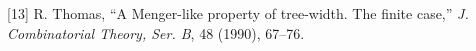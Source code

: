 [13] R. Thomas, ``A Menger-like property of tree-width. The finite case,'' \textit{J. Combinatorial Theory, Ser. B}, 48 (1990), 67--76.
